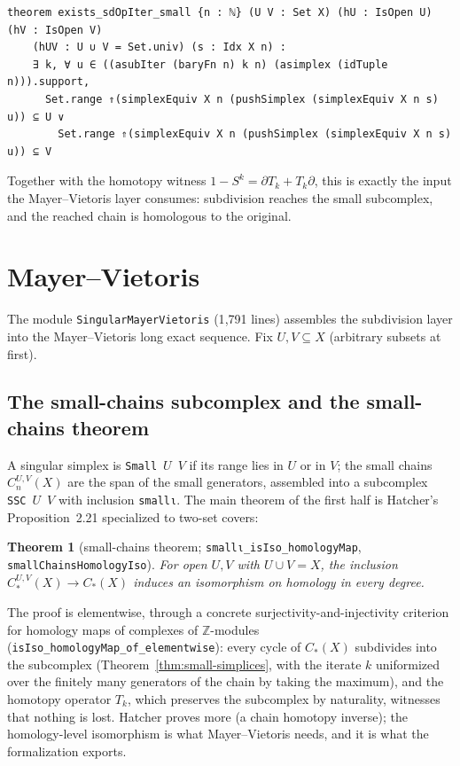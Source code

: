 \documentclass[11pt]{article}
\newtheorem{theorem}{Theorem}[section]
\theoremstyle{remark}
\newcommand{\Z}{\mathbb{Z}}
\newcommand{\leanname}[1]{\texttt{#1}}
\begin{document}
\begin{lstlisting}
theorem exists_sdOpIter_small {n : ℕ} (U V : Set X) (hU : IsOpen U) (hV : IsOpen V)
    (hUV : U ∪ V = Set.univ) (s : Idx X n) :
    ∃ k, ∀ u ∈ ((asubIter (baryFn n) k n) (asimplex (idTuple n))).support,
      Set.range ⇑(simplexEquiv X n (pushSimplex (simplexEquiv X n s) u)) ⊆ U ∨
        Set.range ⇑(simplexEquiv X n (pushSimplex (simplexEquiv X n s) u)) ⊆ V
\end{lstlisting}

Together with the homotopy witness $1 - S^k = \partial T_k + T_k \partial$,
this is exactly the input the Mayer--Vietoris layer consumes: subdivision
reaches the small subcomplex, and the reached chain is homologous to the
original.

\section{Mayer--Vietoris}\label{sec:mv}

The module \leanname{SingularMayerVietoris} (1{,}791 lines) assembles the
subdivision layer into the Mayer--Vietoris long exact sequence. Fix
$U, V \subseteq X$ (arbitrary subsets at first).

\subsection{The small-chains subcomplex and the small-chains theorem}

A singular simplex is \leanname{Small}~$U$~$V$ if its range lies in $U$ or
in $V$; the small chains $C^{U,V}_n(X)$ are the span of the small
generators, assembled into a subcomplex \leanname{SSC}~$U$~$V$ with
inclusion \leanname{smallι}. The main theorem of the first half is
Hatcher's Proposition~2.21 specialized to two-set covers:

\begin{theorem}[small-chains theorem; \leanname{smallι\_isIso\_homologyMap},
\leanname{smallChainsHomologyIso}]\label{thm:small-chains}
For open $U, V$ with $U \cup V = X$, the inclusion
$C^{U,V}_*(X) \to C_*(X)$ induces an isomorphism on homology in every
degree.
\end{theorem}

The proof is elementwise, through a concrete surjectivity-and-injectivity
criterion for homology maps of complexes of $\Z$-modules
(\leanname{isIso\_homologyMap\_of\_elementwise}): every cycle of $C_*(X)$
subdivides into the subcomplex (Theorem~\ref{thm:small-simplices}, with the
iterate $k$ uniformized over the finitely many generators of the chain by
taking the maximum), and the homotopy operator $T_k$, which preserves the
subcomplex by naturality, witnesses that nothing is lost. Hatcher proves
more (a chain homotopy inverse); the homology-level isomorphism is what
Mayer--Vietoris needs, and it is what the formalization exports.
\end{document}
